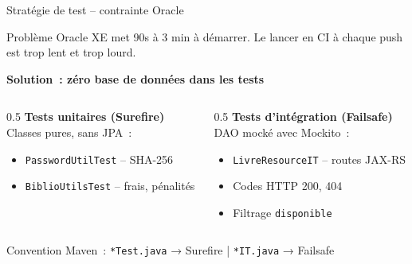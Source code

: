 \documentclass[aspectratio=169,12pt]{beamer}
\begin{document}
\begin{frame}{Stratégie de test -- contrainte Oracle}
  \begin{alertblock}{Problème}
    Oracle XE met 90s à 3 min à démarrer. Le lancer en CI à chaque push est
    trop lent et trop lourd.
  \end{alertblock}

  \vspace{0.5em}
  \textbf{Solution~: zéro base de données dans les tests}

  \begin{columns}
    \begin{column}{0.5\textwidth}
      \textbf{Tests unitaires (Surefire)}\\[0.3em]
      Classes pures, sans JPA~:
      \begin{itemize}
        \item \texttt{PasswordUtilTest} -- SHA-256
        \item \texttt{BiblioUtilsTest} -- frais, pénalités
      \end{itemize}
    \end{column}
    \begin{column}{0.5\textwidth}
      \textbf{Tests d'intégration (Failsafe)}\\[0.3em]
      DAO mocké avec Mockito~:
      \begin{itemize}
        \item \texttt{LivreResourceIT} -- routes JAX-RS
        \item Codes HTTP 200, 404
        \item Filtrage \texttt{disponible}
      \end{itemize}
    \end{column}
  \end{columns}

  \vspace{0.5em}
  \small Convention Maven~: \texttt{*Test.java} → Surefire \quad|\quad
  \texttt{*IT.java} → Failsafe
\end{frame}
\end{document}
